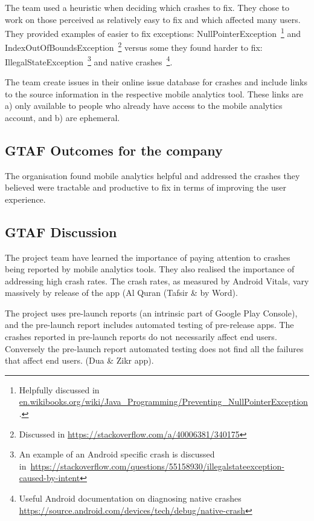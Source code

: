 The team used a heuristic when deciding which crashes to fix. They chose to work on those perceived as relatively easy to fix and which affected many users. They provided examples of easier to fix exceptions: NullPointerException~\footnote{Helpfully discussed in \href{https://en.wikibooks.org/wiki/Java\_Programming/Preventing\_NullPointerException}{en.wikibooks.org/wiki/Java\_Programming/Preventing\_NullPointerException}.} and IndexOutOfBoundsException~\footnote{Discussed in \url{https://stackoverflow.com/a/40006381/340175}} versus some they found harder to fix: IllegalStateException~\footnote{An example of an Android specific crash is discussed in~\url{https://stackoverflow.com/questions/55158930/illegalstateexception-caused-by-intent}} and native crashes~\footnote{Useful Android documentation on diagnosing native crashes \url{https://source.android.com/devices/tech/debug/native-crash}}.

The team create issues in their online issue database for crashes and include links to the source information in the respective mobile analytics tool. These links are a) only available to people who already have access to the mobile analytics account, and b) are ephemeral.

\subsection{GTAF Outcomes for the company}
The organisation found mobile analytics helpful and addressed the crashes they believed were tractable and productive to fix in terms of improving the user experience.

\subsection{GTAF Discussion}
The project team have learned the importance of paying attention to crashes being reported by mobile analytics tools. They also realised the importance of addressing high crash rates. The crash rates, as measured by Android Vitals, vary massively by release of the app (Al Quran (Tafsir \& by Word). 

The project uses pre-launch reports (an intrinsic part of Google Play Console), and the pre-launch report includes automated testing of pre-release apps. The crashes reported in pre-launch reports do not necessarily affect end users. Conversely the pre-launch report automated testing does not find all the failures that affect end users. (Dua \& Zikr app).

